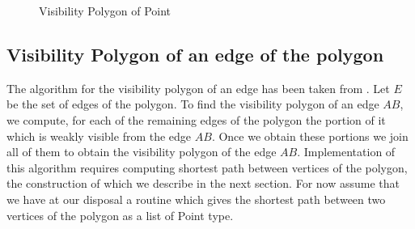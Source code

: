 \documentclass[a4paper,10pt]{article}
\begin{document}
\begin{figure}[h]
\begin{center}
\caption{\label{fig:Visibility Polygon of Point}Visibility Polygon of Point}
\end{center}
\end{figure}





\newcommand{\jttstylea}{\color[rgb]{1.00,1.00,1.00}} %
\newcommand{\jttstyleb}{\color[rgb]{.501,.501,.501}} %
\newcommand{\jttstylec}{\color[rgb]{.247,.498,.372}} %
\newcommand{\jttstyled}{\color[rgb]{.247,.498,.372}} %
\newcommand{\jttstylee}{\color[rgb]{.498,.000,.333}} %
\newcommand{\jttstylef}{\color[rgb]{.164,.000,1.00}} %
\newcommand{\jttstyleg}{\color[rgb]{.600,.000,.000}} %
\newcommand{\jttstyleh}{\color[rgb]{.600,.000,.000}} %
\newcommand{\jttstylei}{\color[rgb]{.000,.000,.000}} %
\newcommand{\jttstylej}{\color[rgb]{.498,.000,.333}} %
\newcommand{\jttstylek}{\color[rgb]{.000,.000,.000}} %
\newcommand{\jttstylel}{\color[rgb]{.498,.623,.749}} %
\newcommand{\jttstylem}{\color[rgb]{.498,.498,.623}} %
\newcommand{\jttstylen}{\color[rgb]{.247,.247,.749}} %
\newcommand{\jttstyleo}{\color[rgb]{.247,.372,.749}} %
\newcommand{\jttstylep}{\color[rgb]{1.00,.380,.000}} %
\newcommand{\jttstyleq}{\color[rgb]{.392,.392,.392}} %




\subsection{Visibility Polygon of an edge of the polygon}
The algorithm for the visibility polygon of an edge has been taken from \cite{key3}.
Let $E$ be the set of edges of the polygon. To find the visibility polygon of an edge $AB$, we compute, for each of 
 the remaining edges of the polygon the portion of it which is weakly visible from the edge $AB$. Once we obtain these portions we join
 all of them to obtain the visibility polygon of the edge $AB$.
  Implementation of this algorithm requires computing shortest path between vertices of the polygon, the construction of which we 
describe in the next section. For now assume that we have at our disposal a routine which gives the shortest path between two vertices 
of the polygon as a list of Point type.
\end{document}
